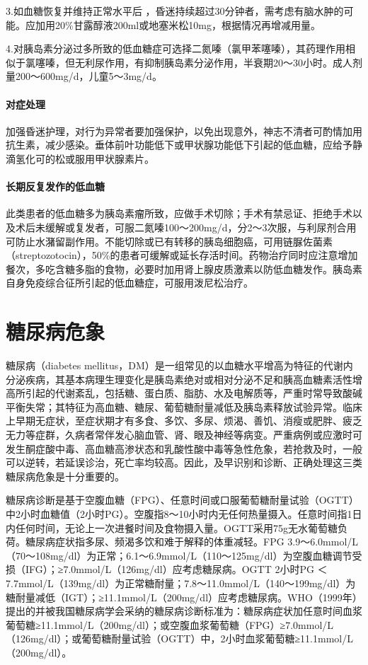 3.如血糖恢复并维持正常水平后
，昏迷持续超过30分钟者，需考虑有脑水肿的可能。应加用20\%甘露醇液200ml或地塞米松10mg，根据情况再增减用量。

4.对胰岛素分泌过多所致的低血糖症可选择二氮嗪（氯甲苯噻嗪），其药理作用相似于氯噻嗪，但无利尿作用，有抑制胰岛素分泌作用，半衰期20～30小时。成人剂量200～600mg/d，儿童5～3mg/d。

\subsubsection{对症处理}

加强昏迷护理，对行为异常者要加强保护，以免出现意外，神志不清者可酌情加用抗生素，减少感染。垂体前叶功能低下或甲状腺功能低下引起的低血糖，应给予静滴氢化可的松或服用甲状腺素片。

\subsubsection{长期反复发作的低血糖}

此类患者的低血糖多为胰岛素瘤所致，应做手术切除；手术有禁忌证、拒绝手术以及术后未缓解或复发者，可服二氮嗪100～200mg/d，分2～3次服，与利尿剂合用可防止水潴留副作用。不能切除或已有转移的胰岛细胞癌，可用链脲佐菌素（streptozotocin），50\%的患者可缓解或延长存活时间。药物治疗同时应注意增加餐次，多吃含糖多脂的食物，必要时加用肾上腺皮质激素以防低血糖发作。胰岛素自身免疫综合征所引起的低血糖症，可服用泼尼松治疗。
\protect\hypertarget{text00121.html}{}{}

\chapter{糖尿病危象}

糖尿病（diabetes
mellitus，DM）是一组常见的以血糖水平增高为特征的代谢内分泌疾病，其基本病理生理变化是胰岛素绝对或相对分泌不足和胰高血糖素活性增高所引起的代谢紊乱，包括糖、蛋白质、脂肪、水及电解质等，严重时常导致酸碱平衡失常；其特征为高血糖、糖尿、葡萄糖耐量减低及胰岛素释放试验异常。临床上早期无症状，至症状期才有多食、多饮、多尿、烦渴、善饥、消瘦或肥胖、疲乏无力等症群，久病者常伴发心脑血管、肾、眼及神经等病变。严重病例或应激时可发生酮症酸中毒、高血糖高渗状态和乳酸性酸中毒等急性危象，若抢救及时，一般可以逆转，若延误诊治，死亡率均较高。因此，及早识别和诊断、正确处理这三类糖尿病危象是十分重要的。

糖尿病诊断是基于空腹血糖（FPG）、任意时间或口服葡萄糖耐量试验（OGTT）中2小时血糖值（2小时PG）。空腹指8～10小时内无任何热量摄入。任意时间指1日内任何时间，无论上一次进餐时间及食物摄入量。OGTT采用75g无水葡萄糖负荷。糖尿病症状指多尿、频渴多饮和难于解释的体重减轻。FPG
3.9～6.0mmol/L（70～108mg/dl）为正常；6.1～6.9mmol/L（110～125mg/dl）为空腹血糖调节受损（IFG）；≥7.0mmol/L（126mg/dl）应考虑糖尿病。OGTT
2小时PG ＜
7.7mmol/L（139mg/dl）为正常糖耐量；7.8～11.0mmol/L（140～199mg/dl）为糖耐量减低（IGT）；≥11.1mmol/L（200mg/dl）应考虑糖尿病。WHO（1999年）提出的并被我国糖尿病学会采纳的糖尿病诊断标准为：糖尿病症状加任意时间血浆葡萄糖≥11.1mmol/L（200mg/dl）；或空腹血浆葡萄糖（FPG）≥7.0mmol/L（126mg/dl）；或葡萄糖耐量试验（OGTT）中，2小时血浆葡萄糖≥11.1mmol/L
（200mg/dl）。

